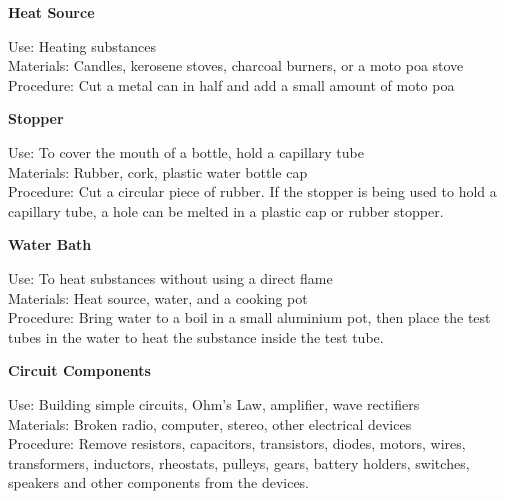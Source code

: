 \begin{flushleft}
\textbf{Heat Source}
\end{flushleft}
\vspace{-10pt}
Use: Heating substances\\
Materials: Candles, kerosene stoves, charcoal burners, or a moto poa stove\\
Procedure: Cut a metal can in half and add a small amount of moto poa\\


\begin{flushleft}
\textbf{Stopper}
\end{flushleft}
\vspace{-10pt}
Use: To cover the mouth of a bottle, hold a capillary tube\\
Materials: Rubber, cork, plastic water bottle cap\\
Procedure: Cut a circular piece of rubber.  If the stopper is being used to hold a capillary tube, a hole can be melted in a plastic cap or rubber stopper.\\


\begin{flushleft}
\textbf{Water Bath}
\end{flushleft}
\vspace{-10pt}
Use: To heat substances without using a direct flame\\
Materials: Heat source, water, and a cooking pot\\
Procedure: Bring water to a boil in a small aluminium pot, then place the test tubes in the water to heat the substance inside the test tube.  \\

\begin{flushleft}
\textbf{Circuit Components}
\end{flushleft}
\vspace{-10pt}
Use: Building simple circuits, Ohm's Law, amplifier, wave rectifiers\\
Materials: Broken radio, computer, stereo, other electrical devices\\
Procedure: Remove resistors, capacitors, transistors, diodes, motors, wires, transformers, inductors, rheostats, pulleys, gears, battery holders, switches, speakers and other components from the devices.\\


